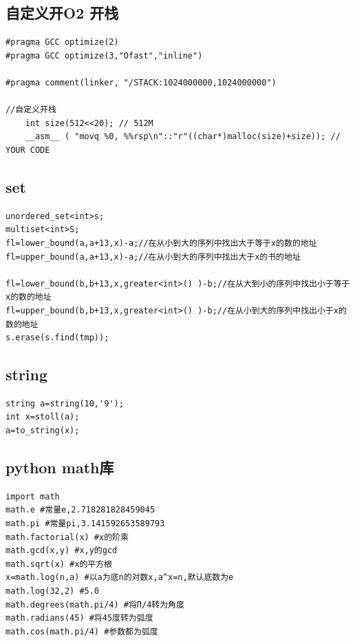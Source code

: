\documentclass[12pt, a4paper, oneside]{ctexart}
\begin{document}
\newpage
\subsection{自定义开O2 开栈} 
\begin{lstlisting}
#pragma GCC optimize(2)
#pragma GCC optimize(3,"Ofast","inline")

#pragma comment(linker, "/STACK:1024000000,1024000000")

//自定义开栈
	int size(512<<20); // 512M
    __asm__ ( "movq %0, %%rsp\n"::"r"((char*)malloc(size)+size)); // YOUR CODE
\end{lstlisting}


\newpage
\subsection{set} 
\begin{lstlisting}
unordered_set<int>s;
multiset<int>S;
fl=lower_bound(a,a+13,x)-a;//在从小到大的序列中找出大于等于x的数的地址 
fl=upper_bound(a,a+13,x)-a;//在从小到大的序列中找出大于x的书的地址

fl=lower_bound(b,b+13,x,greater<int>() )-b;//在从大到小的序列中找出小于等于x的数的地址 
fl=upper_bound(b,b+13,x,greater<int>() )-b;//在从小到大的序列中找出小于x的数的地址 
s.erase(s.find(tmp));
\end{lstlisting}



\subsection{string} 
\begin{lstlisting}
string a=string(10,'9'); 
int x=stoll(a);
a=to_string(x);
\end{lstlisting}


\subsection{python math库} 
\begin{lstlisting}
import math
math.e #常量e,2.718281828459045
math.pi #常量pi,3.141592653589793
math.factorial(x) #x的阶乘
math.gcd(x,y) #x,y的gcd
math.sqrt(x) #x的平方根
x=math.log(n,a) #以a为底n的对数x,a^x=n,默认底数为e
math.log(32,2) #5.0
math.degrees(math.pi/4) #将Π/4转为角度
math.radians(45) #将45度转为弧度
math.cos(math.pi/4) #参数都为弧度

\end{lstlisting}
\end{document}
